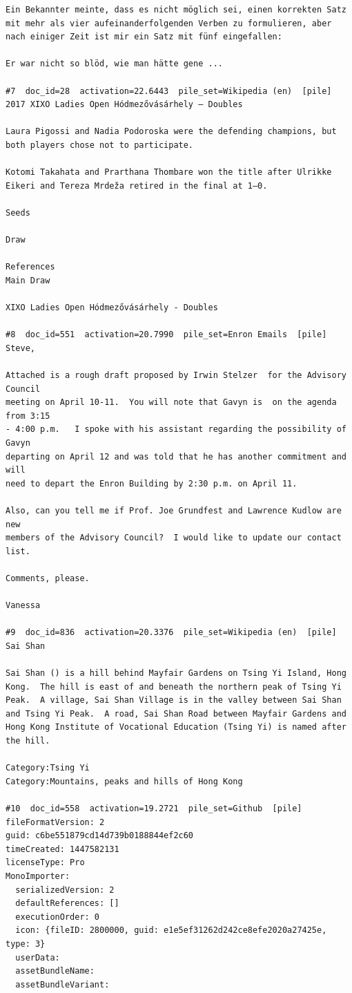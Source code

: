 \begin{verbatim}
Ein Bekannter meinte, dass es nicht möglich sei, einen korrekten Satz mit mehr als vier aufeinanderfolgenden Verben zu formulieren, aber nach einiger Zeit ist mir ein Satz mit fünf eingefallen:

Er war nicht so blöd, wie man hätte gene ...

#7  doc_id=28  activation=22.6443  pile_set=Wikipedia (en)  [pile]
2017 XIXO Ladies Open Hódmezővásárhely – Doubles

Laura Pigossi and Nadia Podoroska were the defending champions, but both players chose not to participate.

Kotomi Takahata and Prarthana Thombare won the title after Ulrikke Eikeri and Tereza Mrdeža retired in the final at 1–0.

Seeds

Draw

References
Main Draw

XIXO Ladies Open Hódmezővásárhely - Doubles

#8  doc_id=551  activation=20.7990  pile_set=Enron Emails  [pile]
Steve,

Attached is a rough draft proposed by Irwin Stelzer  for the Advisory Council 
meeting on April 10-11.  You will note that Gavyn is  on the agenda from 3:15 
- 4:00 p.m.   I spoke with his assistant regarding the possibility of Gavyn 
departing on April 12 and was told that he has another commitment and will 
need to depart the Enron Building by 2:30 p.m. on April 11. 

Also, can you tell me if Prof. Joe Grundfest and Lawrence Kudlow are new 
members of the Advisory Council?  I would like to update our contact list.

Comments, please.

Vanessa

#9  doc_id=836  activation=20.3376  pile_set=Wikipedia (en)  [pile]
Sai Shan

Sai Shan () is a hill behind Mayfair Gardens on Tsing Yi Island, Hong Kong.  The hill is east of and beneath the northern peak of Tsing Yi Peak.  A village, Sai Shan Village is in the valley between Sai Shan and Tsing Yi Peak.  A road, Sai Shan Road between Mayfair Gardens and Hong Kong Institute of Vocational Education (Tsing Yi) is named after the hill.

Category:Tsing Yi
Category:Mountains, peaks and hills of Hong Kong

#10  doc_id=558  activation=19.2721  pile_set=Github  [pile]
fileFormatVersion: 2
guid: c6be551879cd14d739b0188844ef2c60
timeCreated: 1447582131
licenseType: Pro
MonoImporter:
  serializedVersion: 2
  defaultReferences: []
  executionOrder: 0
  icon: {fileID: 2800000, guid: e1e5ef31262d242ce8efe2020a27425e, type: 3}
  userData: 
  assetBundleName: 
  assetBundleVariant: 


\end{verbatim}

